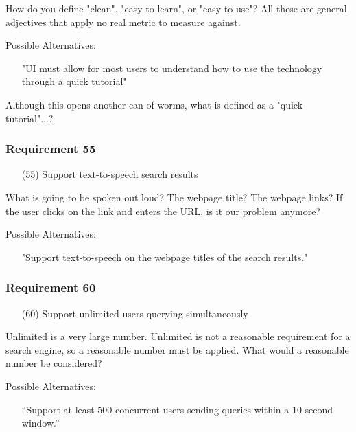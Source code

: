 How do you define "clean", "easy to learn", or "easy to use"? All these are general adjectives that apply no real metric to measure against.

\medskip

Possible Alternatives:
\begin{itemize}
  \item[] "UI must allow for most users to understand how to use the technology through a quick tutorial"
\end{itemize}

Although this opens another can of worms, what is defined as a "quick tutorial"...?

\subsubsection*{Requirement 55}
\begin{itemize}
  \item[(55)] Support text-to-speech search results
\end{itemize}

What is going to be spoken out loud? The webpage title? The webpage links? If the user clicks on the link and enters the URL, is it our problem anymore?

\medskip

Possible Alternatives:
\begin{itemize}
  \item[] "Support text-to-speech on the webpage titles of the search results."
\end{itemize}

\subsubsection*{Requirement 60}
\begin{itemize}
  \item[(60)] Support unlimited users querying simultaneously
\end{itemize}

Unlimited is a very large number. Unlimited is not a reasonable requirement for a search engine, so a reasonable number must be applied. What would a reasonable number be considered?

\medskip

Possible Alternatives:
\begin{itemize}
  \item[] “Support at least 500 concurrent users sending queries within a 10 second window.”
\end{itemize}

